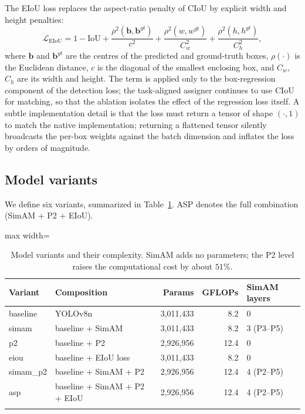 \documentclass[pdflatex,sn-basic,Numbered]{sn-jnl}%
\begin{document}
The EIoU loss replaces the aspect-ratio penalty of CIoU by explicit width and height penalties:
\begin{equation}
\mathcal{L}_{\mathrm{EIoU}} = 1 - \mathrm{IoU} + \frac{\rho^2\!\left(\mathbf{b},\mathbf{b}^{gt}\right)}{c^2} + \frac{\rho^2\!\left(w,w^{gt}\right)}{C_w^2} + \frac{\rho^2\!\left(h,h^{gt}\right)}{C_h^2},
\label{eq:eiou}
\end{equation}
where $\mathbf{b}$ and $\mathbf{b}^{gt}$ are the centres of the predicted and ground-truth boxes, $\rho(\cdot)$ is the Euclidean distance, $c$ is the diagonal of the smallest enclosing box, and $C_w$, $C_h$ are its width and height. The term is applied only to the box-regression component of the detection loss; the task-aligned assigner continues to use CIoU for matching, so that the ablation isolates the effect of the regression loss itself. A subtle implementation detail is that the loss must return a tensor of shape $(\cdot,1)$ to match the native implementation; returning a flattened tensor silently broadcasts the per-box weights against the batch dimension and inflates the loss by orders of magnitude.

\subsection{Model variants}\label{sec:variants}

We define six variants, summarized in Table~\ref{tab:variants}. ASP denotes the full combination (SimAM + P2 + EIoU).

\begin{table}[t]
\caption{Model variants and their complexity. SimAM adds no parameters; the P2 level raises the computational cost by about $51\%$.}\label{tab:variants}%
\centering
\begin{adjustbox}{max width=\textwidth}
\begin{tabular}{@{}llrrl@{}}
\toprule
Variant & Composition & Params & GFLOPs & SimAM layers\\
\midrule
baseline & YOLOv8n & 3{,}011{,}433 & 8.2 & 0\\
simam & baseline + SimAM & 3{,}011{,}433 & 8.2 & 3 (P3--P5)\\
p2 & baseline + P2 & 2{,}926{,}956 & 12.4 & 0\\
eiou & baseline + EIoU loss & 3{,}011{,}433 & 8.2 & 0\\
simam\_p2 & baseline + SimAM + P2 & 2{,}926{,}956 & 12.4 & 4 (P2--P5)\\
asp & baseline + SimAM + P2 + EIoU & 2{,}926{,}956 & 12.4 & 4 (P2--P5)\\
\botrule
\end{tabular}
\end{adjustbox}
\end{table}
\end{document}
